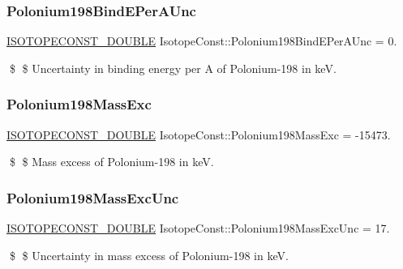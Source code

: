 \subsubsection{\texorpdfstring{Polonium198\+Bind\+E\+Per\+A\+Unc}{Polonium198BindEPerAUnc}}
{\footnotesize\ttfamily \mbox{\hyperlink{group___isotope_const-_macros_ga8f45a7272ce02c0b4c65c44636ed719a}{I\+S\+O\+T\+O\+P\+E\+C\+O\+N\+S\+T\+\_\+\+D\+O\+U\+B\+LE}} Isotope\+Const\+::\+Polonium198\+Bind\+E\+Per\+A\+Unc = 0.}

\$ \$ Uncertainty in binding energy per A of Polonium-\/198 in keV. \mbox{\label{group___isotope_const-_polonium-_po198_ga74de6291d99912e5ac2cc4bbbb5c3868}} 
\subsubsection{\texorpdfstring{Polonium198\+Mass\+Exc}{Polonium198MassExc}}
{\footnotesize\ttfamily \mbox{\hyperlink{group___isotope_const-_macros_ga8f45a7272ce02c0b4c65c44636ed719a}{I\+S\+O\+T\+O\+P\+E\+C\+O\+N\+S\+T\+\_\+\+D\+O\+U\+B\+LE}} Isotope\+Const\+::\+Polonium198\+Mass\+Exc = -\/15473.}

\$ \$ Mass excess of Polonium-\/198 in keV. \mbox{\label{group___isotope_const-_polonium-_po198_ga528091fc98f227e892e1cff8c9b6c7c0}} 
\subsubsection{\texorpdfstring{Polonium198\+Mass\+Exc\+Unc}{Polonium198MassExcUnc}}
{\footnotesize\ttfamily \mbox{\hyperlink{group___isotope_const-_macros_ga8f45a7272ce02c0b4c65c44636ed719a}{I\+S\+O\+T\+O\+P\+E\+C\+O\+N\+S\+T\+\_\+\+D\+O\+U\+B\+LE}} Isotope\+Const\+::\+Polonium198\+Mass\+Exc\+Unc = 17.}

\$ \$ Uncertainty in mass excess of Polonium-\/198 in keV. \mbox{\label{group___isotope_const-_polonium-_po198_gaced5150cb5d410d4a46fba5356b34d54}} 
